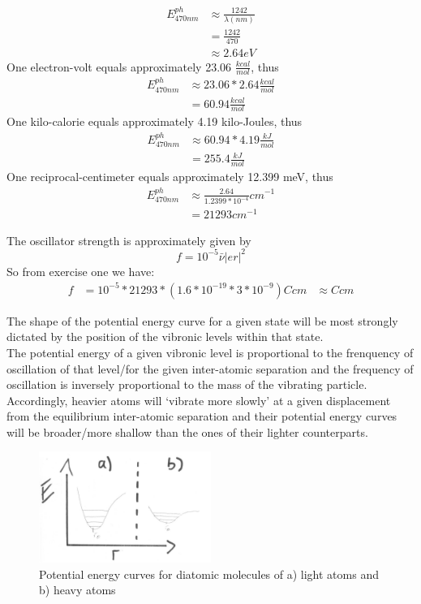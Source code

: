 \documentclass[10pt]{article}
\begin{document}

\begin{align*}
E^{ph}_{470nm} & \approx \frac{1242}{\lambda (nm)} \\
				& = \frac{1242}{470} \\
				& \approx 2.64 eV
\end{align*}
One electron-volt equals approximately 23.06 $\frac{kcal}{mol}$, thus
\begin{align*}
E^{ph}_{470nm} & \approx 23.06*2.64\frac{kcal}{mol}\\
				& = 60.94 \frac{kcal}{mol}
\end{align*}
One kilo-calorie equals approximately 4.19 kilo-Joules, thus
\begin{align*}
E^{ph}_{470nm}& \approx 60.94 * 4.19 \frac{kJ}{mol} \\
				& = 255.4 \frac{kJ}{mol}
\end{align*}
One reciprocal-centimeter equals approximately 12.399 meV, thus
\begin{align*}
E^{ph}_{470nm} & \approx \frac{2.64}{1.2399*10^{-4}} cm^{-1} \\
				& = 21293 cm^{-1}
\end{align*}

The oscillator strength is approximately given by
\begin{equation*}
f = 10^{-5} \bar{\nu} |er|^2
\end{equation*}
So from exercise one we have:
\begin{align*}
f  	&= 10^{-5} * 21293 * (1.6 * 10^{-19}* 3 * 10^{-9}) Ccm 
	& \approx Ccm
\end{align*}

The shape of the potential energy curve for a given state will be most strongly dictated by the position of the vibronic levels within that state.\\
The potential energy of a given vibronic level is proportional to the frenquency of oscillation of that level/for the given inter-atomic separation and the frequency of oscillation is inversely proportional to the mass of the vibrating particle. Accordingly, heavier atoms will `vibrate more slowly' at a given displacement from the equilibrium inter-atomic separation and their potential energy curves will be broader/more shallow than the ones of their lighter counterparts.
\begin{figure}
\begin{centering}
\includegraphics[width=0.5\textwidth]{f1}
\caption{Potential energy curves for diatomic molecules of a) light atoms and b) heavy atoms}
\end{centering}
\end{figure}
\end{document}
